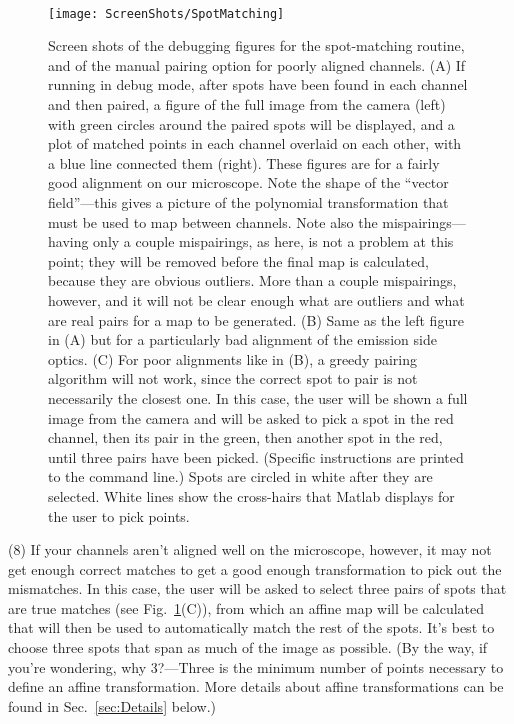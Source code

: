 \documentclass[11pt]{article}
\begin{document}
 \\

\begin{figure}
\begin{center}
\texttt{[image: ScreenShots/SpotMatching]}
\caption{Screen shots of the debugging figures for the spot-matching routine, and of the manual pairing option for poorly aligned channels. (A) If running in debug mode, after spots have been found in each channel and then paired, a figure of the full image from the camera (left) with green circles around the paired spots will be displayed, and a plot of matched points in each channel overlaid on each other, with a blue line connected them (right). These figures are for a fairly good alignment on our microscope. Note the shape of the ``vector field''---this gives a picture of the polynomial transformation that must be used to map between channels. Note also the mispairings---having only a couple mispairings, as here, is not a problem at this point; they will be removed before the final map is calculated, because they are obvious outliers.  More than a couple mispairings, however, and it will not be clear enough what are outliers and what are real pairs for a map to be generated. (B) Same as the left figure in (A) but for a particularly bad alignment of the emission side optics. (C) For poor alignments like in (B), a greedy pairing algorithm will not work, since the correct spot to pair is not necessarily the closest one.  In this case, the user will be shown a full image from the camera and will be asked to pick a spot in the red channel, then its pair in the green, then another spot in the red, until three pairs have been picked. (Specific instructions are printed to the command line.)  Spots are circled in white after they are selected.  White lines show the cross-hairs that Matlab displays for the user to pick points.}
\label{fig:PairingShot}
\end{center}
\end{figure}

\noindent (8) If your channels aren't aligned well on the microscope, however, it may not get enough correct matches to get a good enough transformation to pick out the mismatches.  In this case, the user will be asked to select three pairs of spots that are true matches (see Fig.~\ref{fig:PairingShot}(C)), from which an affine map will be calculated that will then be used to automatically match the rest of the spots.  It's best to choose three spots that span as much of the image as possible.  (By the way, if you're wondering, why 3?---Three is the minimum number of points necessary to define an affine transformation.  More details about affine transformations can be found in Sec.~\ref{sec:Details} below.)
\end{document}

